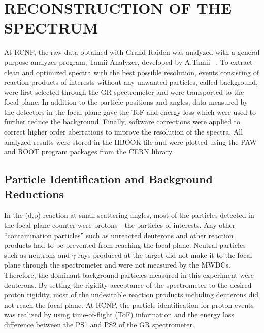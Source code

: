 
%


\chapter{RECONSTRUCTION OF THE SPECTRUM}

At RCNP, the raw data  obtained with Grand Raiden was analyzed with  a general purpose analyzer program, Tamii Analyzer, developed by A.Tamii ~\citep{Tamii-ana}.
To extract  clean and optimized spectra with the best possible resolution, events consisting of reaction products of interests without any  unwanted particles, called background, were first selected through the GR spectrometer and were transported to the focal plane. In addition to the particle positions and angles,  data measured by the detectors in the focal plane gave the ToF and energy loss  which were used to further reduce the background.
Finally,  software corrections were applied to correct higher order aberrations to improve the resolution of the spectra. All analyzed results were  stored in the HBOOK file and were plotted using the PAW and ROOT program packages from the CERN library.

\section{Particle Identification and Background Reductions}



In the (d,p) reaction at small scattering angles, most of the particles detected in the focal plane counter were protons - the particles of interests. Any other ``contamination particles'' such as unreacted deuterons and other reaction products had to be prevented from  reaching the focal plane. Neutral particles such as neutrons and $\gamma$-rays produced at the target did not make it to the focal plane through the spectrometer and were not measured by the MWDCs. Therefore, the dominant background particles  measured in this experiment were deuterons. By setting the rigidity acceptance of the spectrometer to the desired proton rigidity, most of the undesirable reaction products including deuterons did not reach the focal plane.
At RCNP, the particle identification for proton events was realized by using time-of-flight (ToF) information and the energy loss difference between the PS1 and PS2 of the GR spectrometer.



